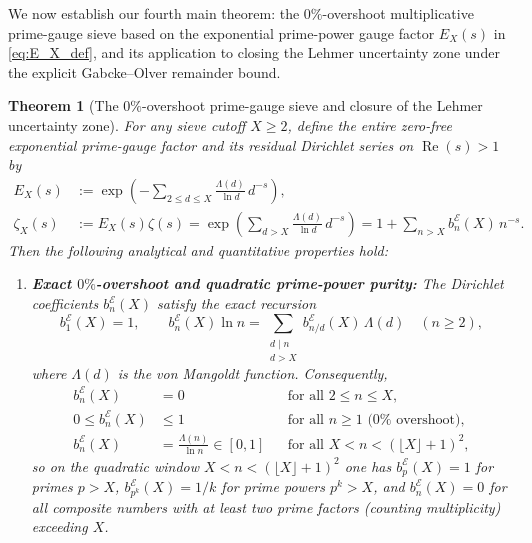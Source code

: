 \documentclass[11pt,reqno,a4paper]{amsart}
\theoremstyle{plain}
\newtheorem{theorem}{Theorem}[section]
\theoremstyle{definition}
\theoremstyle{remark}
\numberwithin{equation}{section}
\begin{document}
We now establish our fourth main theorem: the $0\%$-overshoot multiplicative prime-gauge sieve based on the exponential prime-power gauge factor $E_X(s)$ in \eqref{eq:E_X_def}, and its application to closing the Lehmer uncertainty zone under the explicit Gabcke--Olver remainder bound.

\begin{theorem}[The $0\%$-overshoot prime-gauge sieve and closure of the Lehmer uncertainty zone]\label{thm:prime_gauge_sieve}
For any sieve cutoff $X \ge 2$, define the entire zero-free exponential prime-gauge factor and its residual Dirichlet series on $\operatorname{Re}(s) > 1$ by
\begin{equation}\label{eq:E_X_def}
\begin{aligned}
  E_X(s) &:= \exp\left(-\sum_{2 \le d \le X}\frac{\Lambda(d)}{\ln d}\,d^{-s}\right), \\
  \zeta_X(s) &:= E_X(s)\zeta(s) = \exp\left(\sum_{d > X}\frac{\Lambda(d)}{\ln d}\,d^{-s}\right) = 1 + \sum_{n > X} b_n^{\mathcal{E}}(X)\,n^{-s}.
\end{aligned}
\end{equation}
Then the following analytical and quantitative properties hold:
\begin{enumerate}[label=\textup{(\arabic*)},leftmargin=2.2em]
  \item \textbf{Exact $0\%$-overshoot and quadratic prime-power purity:} The Dirichlet coefficients $b_n^{\mathcal{E}}(X)$ satisfy the exact recursion
  \begin{equation}\label{eq:b_n_E_recursion}
    b_1^{\mathcal{E}}(X) = 1, \qquad
    b_n^{\mathcal{E}}(X)\ln n = \sum_{\substack{d \mid n \\ d > X}} b_{n/d}^{\mathcal{E}}(X)\,\Lambda(d) \quad (n \ge 2),
  \end{equation}
  where $\Lambda(d)$ is the von Mangoldt function. Consequently,
  \begin{equation}\label{eq:b_n_E_bounds}
  \begin{aligned}
    b_n^{\mathcal{E}}(X) &= 0 &&\text{for all } 2 \le n \le X, \\
    0 \le b_n^{\mathcal{E}}(X) &\le 1 &&\text{for all } n \ge 1 \text{ ($0\%$ overshoot)}, \\
    b_n^{\mathcal{E}}(X) &= \frac{\Lambda(n)}{\ln n} \in [0,1] &&\text{for all } X < n < (\lfloor X\rfloor + 1)^2,
  \end{aligned}
  \end{equation}
  so on the quadratic window $X < n < (\lfloor X\rfloor + 1)^2$ one has $b_p^{\mathcal{E}}(X) = 1$ for primes $p > X$, $b_{p^k}^{\mathcal{E}}(X) = 1/k$ for prime powers $p^k > X$, and $b_n^{\mathcal{E}}(X) = 0$ for all composite numbers with at least two prime factors (counting multiplicity) exceeding $X$.

\end{enumerate}
\end{theorem}
\end{document}
